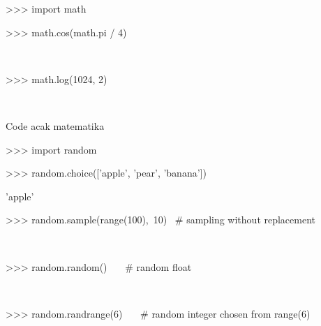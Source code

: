 \documentclass[a4paper,12pt]{report}
\begin{document}
{\fontsize{14pt}{14pt}\selectfont >>> import math \\} \par
\vspace{14pt}
\noindent 
{\fontsize{14pt}{14pt}\selectfont >>> math.cos(math.pi / 4) \\} \par
\noindent 
{\fontsize{14pt}{14pt} \\} \par
\vspace{14pt}
\noindent 
{\fontsize{14pt}{14pt}\selectfont >>> math.log(1024, 2) \\} \par
\noindent 
{\fontsize{14pt}{14pt} \\} \par
\vspace{14pt}
\noindent 
{\fontsize{14pt}{14pt}\selectfont Code acak matematika \\} \par
\vspace{14pt}
\noindent 
{\fontsize{14pt}{14pt}\selectfont >>> import random \\} \par
\vspace{14pt}
\noindent 
{\fontsize{14pt}{14pt}\selectfont >>> random.choice(['apple', 'pear', 'banana']) \\} \par
\noindent 
{\fontsize{14pt}{14pt}\selectfont 'apple' \\} \par
\vspace{14pt}
\noindent 
{\fontsize{14pt}{14pt}\selectfont >>> random.sample(range(100),~10)~   $  \#  $ sampling without replacement \\} \par
\noindent 
{\fontsize{14pt}{14pt}\selectfont [30, 83, 16, 4, 8, 81, 41, 50, 18, 33] \\} \par
\vspace{14pt}
\noindent 
{\fontsize{14pt}{14pt}\selectfont >>> random.random()~~~  $  \#  $ random float \\} \par
\noindent 
{\fontsize{14pt}{14pt} \\} \par
\vspace{14pt}
\noindent 
{\fontsize{14pt}{14pt}\selectfont >>> random.randrange(6)~~~  $  \#  $ random integer chosen from range(6) \\} \par
\end{document}
